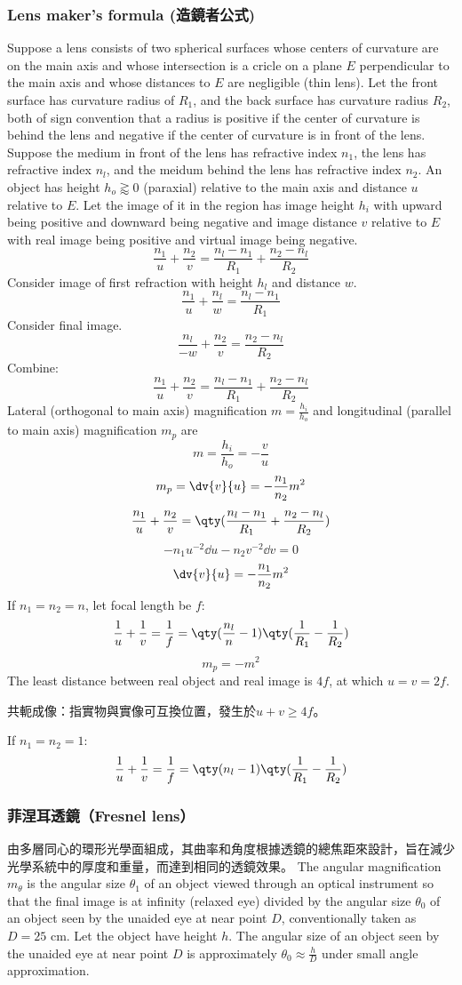 \documentclass[a4paper,12pt]{report}
\begin{document}
\subsubsection{Lens maker's formula (造鏡者公式)}
Suppose a lens consists of two spherical surfaces whose centers of curvature are on the main axis and whose intersection is a cricle on a plane $E$ perpendicular to the main axis and whose distances to $E$ are negligible (thin lens). Let the front surface has curvature radius of $R_1$, and the back surface has curvature radius $R_2$, both of sign convention that a radius is positive if the center of curvature is behind the lens and negative if the center of curvature is in front of the lens. Suppose the medium in front of the lens has refractive index $n_1$, the lens has refractive index $n_l$, and the meidum behind the lens has refractive index $n_2$. An object has height $h_o\gtrapprox0$ (paraxial) relative to the main axis and distance $u$ relative to $E$. Let the image of it in the region has image height $h_i$ with upward being positive and downward being negative and image distance $v$ relative to $E$ with real image being positive and virtual image being negative.
\[\frac{n_1}{u}+\frac{n_2}{v}=\frac{n_l-n_1}{R_1}+\frac{n_2-n_l}{R_2}\]
\bpr
Consider image of first refraction with height $h_l$ and distance $w$.
\[\frac{n_1}{u}+\frac{n_l}{w}=\frac{n_l-n_1}{R_1}\]
Consider final image.
\[\frac{n_l}{-w}+\frac{n_2}{v}=\frac{n_2-n_l}{R_2}\]
Combine:
\[\frac{n_1}{u}+\frac{n_2}{v}=\frac{n_l-n_1}{R_1}+\frac{n_2-n_l}{R_2}\]
\epr
Lateral (orthogonal to main axis) magnification $m=\frac{h_i}{h_o}$ and longitudinal (parallel to main axis) magnification $m_p$ are
\[m=\frac{h_i}{h_o}=-\frac{v}{u}\]
\[m_p=\dv{v}{u}=-\frac{n_1}{n_2}m^2\]
\bpr
\[\frac{n_1}{u}+\frac{n_2}{v}=\qty(\frac{n_l-n_1}{R_1}+\frac{n_2-n_l}{R_2})\]
\[-n_1u^{-2}\dd{u}-n_2v^{-2}\dd{v}=0\]
\[\dv{v}{u}=-\frac{n_1}{n_2}m^2\]
\epr
If $n_1=n_2=n$, let focal length be $f$:
\[\frac{1}{u}+\frac{1}{v}=\frac{1}{f}=\qty(\frac{n_l}{n}-1)\qty(\frac{1}{R_1}-\frac{1}{R_2})\]
\[m_p=-m^2\]
The least distance between real object and real image is $4f$, at which $u=v=2f$.

共軛成像：指實物與實像可互換位置，發生於$u+v\geq 4f$。

If $n_1=n_2=1$:
\[\frac{1}{u}+\frac{1}{v}=\frac{1}{f}=\qty(n_l-1)\qty(\frac{1}{R_1}-\frac{1}{R_2})\]
\subsubsection{菲涅耳透鏡（Fresnel lens）}
由多層同心的環形光學面組成，其曲率和角度根據透鏡的總焦距來設計，旨在減少光學系統中的厚度和重量，而達到相同的透鏡效果。
The angular magnification $m_{\theta}$ is the angular size $\theta_1$ of an object viewed through an optical instrument so that the final image is at infinity (relaxed eye) divided by the angular size $\theta_0$ of an object seen by the unaided eye at near point $D$, conventionally taken as $D=25$ cm. Let the object have height $h$. The angular size of an object seen by the unaided eye at near point $D$ is approximately $\theta_0\approx\frac{h}{D}$ under small angle approximation.
\end{document}
